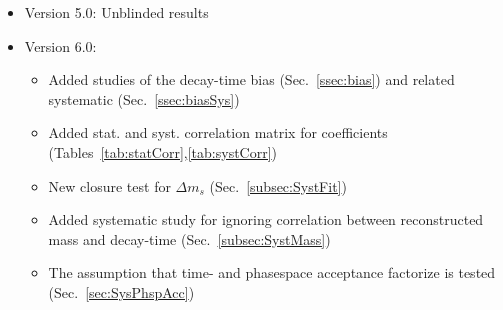 \begin{itemize}
			\item Version 5.0:  Unblinded results 
			
			\item Version 6.0:  
				\begin{itemize}
					\item Added studies of the decay-time bias (Sec.~\ref{ssec:bias}) and related systematic (Sec.~\ref{ssec:biasSys})
					\item Added stat. and syst. correlation matrix for \CP coefficients  (Tables~\ref{tab:statCorr},\ref{tab:systCorr})
					\item New closure test for $\Delta m_s$ (Sec.~\ref{subsec:SystFit})
					\item Added systematic study for ignoring correlation between reconstructed mass and decay-time (Sec.~\ref{subsec:SystMass})
					\item The assumption that time- and phasespace acceptance factorize is tested (Sec.~\ref{sec:SysPhspAcc})
				\end{itemize}

 



\end{itemize}
